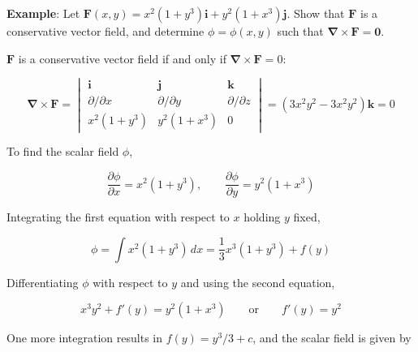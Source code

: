 \begin{paracol}{2}

\textbf{Example}: Let $\mathbf{F}(x, y) = x^2 (1 + y^3) \mathbf{i} + y^2 (1 + x^3) \mathbf{j}$. Show that $\mathbf{F}$ is a conservative vector field, and determine $\phi = \phi(x, y)$ such that $\mathbf{\nabla} \times \mathbf{F} = \mathbf{0}$.

$\mathbf{F}$ is a conservative vector field if and only if $\mathbf{\nabla} \times \mathbf{F} = 0$:

$$
\mathbf{\nabla} \times \mathbf{F} = \begin{vmatrix}
    \mathbf{i} & \mathbf{j} & \mathbf{k} \\
    \partial / \partial x & \partial / \partial y & \partial / \partial z \\
    x^2 (1 + y^3) & y^2 (1 + x^3) & 0
\end{vmatrix} = (3x^2y^2 - 3x^2y^2) \mathbf{k} = 0
$$

To find the scalar field $\phi$,

$$
\frac{\partial \phi}{\partial x} = x^2 (1 + y^3), \qquad \frac{\partial \phi}{\partial y} = y^2 (1 + x^3)
$$

Integrating the first equation with respect to $x$ holding $y$ fixed,

$$
\phi = \int x^2 (1 + y^3) \, dx = \frac{1}{3} x^3 (1 + y^3) + f(y)
$$

Differentiating $\phi$ with respect to $y$ and using the second equation,

$$
x^3 y^2 + f'(y) = y^2 (1 + x^3) \qquad \text{or} \qquad f'(y) = y^2
$$

One more integration results in $f(y) = y^3 / 3 + c$, and the scalar field is given by


\end{paracol}
